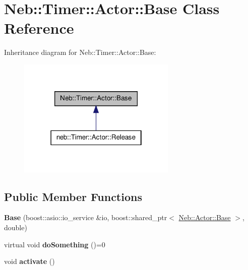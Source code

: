 \hypertarget{classNeb_1_1Timer_1_1Actor_1_1Base}{\section{\-Neb\-:\-:\-Timer\-:\-:\-Actor\-:\-:\-Base \-Class \-Reference}
\label{classNeb_1_1Timer_1_1Actor_1_1Base}
}


\-Inheritance diagram for \-Neb\-:\-:\-Timer\-:\-:\-Actor\-:\-:\-Base\-:\nopagebreak
\begin{figure}[H]
\begin{center}
\leavevmode
\includegraphics[width=214pt]{classNeb_1_1Timer_1_1Actor_1_1Base__inherit__graph}
\end{center}
\end{figure}
\subsection*{\-Public \-Member \-Functions}
\begin{DoxyCompactItemize}
\item 
\hypertarget{classNeb_1_1Timer_1_1Actor_1_1Base_abf4fc9cbf5d86bd2c36da3a9d10f262d}{{\bfseries \-Base} (boost\-::asio\-::io\-\_\-service \&io, boost\-::shared\-\_\-ptr$<$ \hyperlink{classNeb_1_1Actor_1_1Base}{\-Neb\-::\-Actor\-::\-Base} $>$, double)}\label{classNeb_1_1Timer_1_1Actor_1_1Base_abf4fc9cbf5d86bd2c36da3a9d10f262d}

\item 
\hypertarget{classNeb_1_1Timer_1_1Actor_1_1Base_a8e1f81941a3720f925aa376ef2c260e0}{virtual void {\bfseries do\-Something} ()=0}\label{classNeb_1_1Timer_1_1Actor_1_1Base_a8e1f81941a3720f925aa376ef2c260e0}

\item 
\hypertarget{classNeb_1_1Timer_1_1Actor_1_1Base_a698df59a0dc7ebb6a8f0a0dfc45f2004}{void {\bfseries activate} ()}\label{classNeb_1_1Timer_1_1Actor_1_1Base_a698df59a0dc7ebb6a8f0a0dfc45f2004}

\end{DoxyCompactItemize}
